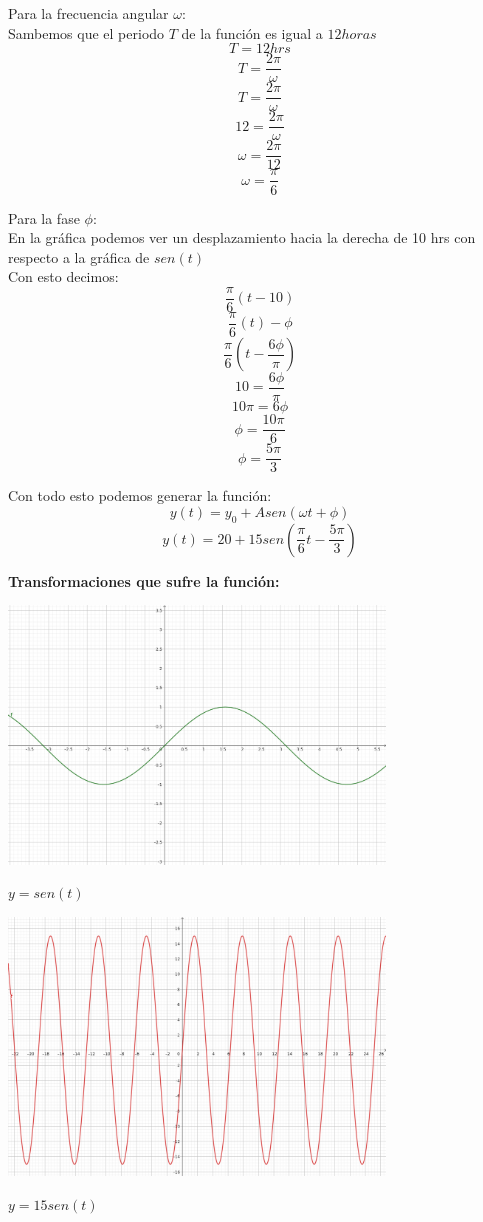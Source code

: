  Para la frecuencia angular $\omega$: \\
 Sambemos que el periodo $T$ de la función es igual a $12 horas$
 \[
 T = 12 hrs
 \]
 \[
 T = \frac{2\pi}{\omega}
 \]
 \[
 T = \frac{2\pi}{\omega}
 \]
 \[
 12 = \frac{2\pi}{\omega}
 \]
 \[
 \omega = \frac{2\pi}{12}
 \]
 \[
 \omega = \frac{\pi}{6}
 \]

Para la fase $\phi$: \\
En la gráfica podemos ver un desplazamiento hacia la derecha de 10 hrs con respecto a la gráfica de $sen(t)$ \\
Con esto decimos: \\
\[
\frac{\pi}{6} (t -10 )
\]
\[
\frac{\pi}{6}(t) - \phi
\]
\[
\frac{\pi}{6}(t - \frac{6\phi}{\pi})
\]
\[
10 = \frac{6\phi}{\pi}
\]
\[
10\pi = 6\phi
\]
\[
\phi = \frac{10\pi}{6}
\]
\[
\phi = \frac{5\pi}{3}
\]

Con todo esto podemos generar la función:
\[
y(t) = y_{0} + Asen(\omega t + \phi)
\]
\[
y(t) = 20 + 15sen(\frac{\pi}{6} t - \frac{5\pi}{3})
\]

\begin{center}
    \textbf{Transformaciones que sufre la función:}
\end{center}

\begin{center}
     \includegraphics[width=10cm]{recursos/seno.png}\par
     $ y = sen(t) $
\end{center}

\begin{center}
     \includegraphics[width=10cm]{recursos/Aseno.png}\par
     $ y = 15sen(t) $
\end{center}

